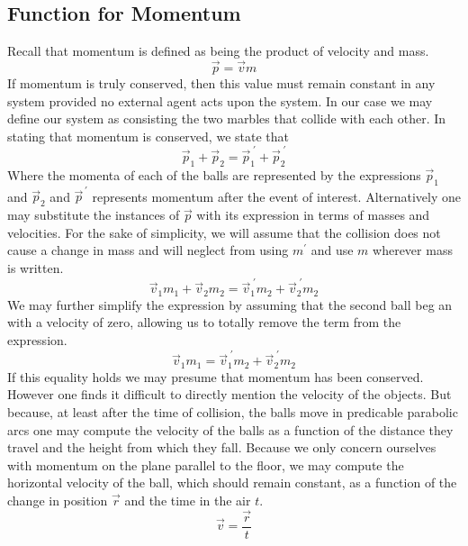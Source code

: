 \documentclass[11pt]{article}
\begin{document}
\subsection{Function for Momentum}
Recall that momentum is defined as being the product of velocity and mass.
\begin{equation}
\vec{p} = \vec{v} m
\end{equation}
If momentum is truly conserved, then this value must remain constant in any system provided no external agent acts upon the system. In our case we may define our system as consisting the two marbles that collide with each other. In stating that momentum is conserved, we state that
\begin{equation}
\vec{p}_1 + \vec{p}_2 = \vec{p}_1^{\; \prime} + \vec{p}_2^{\; \prime}
\end{equation}
Where the momenta of each of the balls are represented by the expressions \( \vec{p}_1 \) and \(\vec{p}_2 \) and \(\vec{p}^{\, \prime} \) represents momentum after the event of interest. Alternatively one may substitute the instances of \(\vec{p}\) with its expression in terms of masses and velocities. For the sake of simplicity, we will assume that the collision does not cause a change in mass and will neglect from using \(m^\prime\) and use \(m\) wherever mass is written.
\begin{equation}
\vec{v}_1 m_1 + \vec{v}_2 m_2 = \vec{v}_1^{\; \prime} m_2 + \vec{v}_2^{\; \prime} m_2
\end{equation}
We may further simplify the expression by assuming that the second ball beg	an with a velocity of zero, allowing us to totally remove the term from the expression.
\begin{equation}
\vec{v}_1 m_1 = \vec{v}_1^{\; \prime} m_2 + \vec{v}_2^{\; \prime} m_2 \label{eq:1}
\end{equation}
If this equality holds we may presume that momentum has been conserved. However one finds it difficult to directly mention the velocity of the objects. But because, at least after the time of collision, the balls move in predicable parabolic arcs one may compute the velocity of the balls as a function of the distance they travel and the height from which they fall. Because we only concern ourselves with momentum on the plane parallel to the floor, we may compute the horizontal velocity of the ball, which should remain constant, as a function of the change in position \( \vec{r} \) and the time in the air \(t\). 
\begin{equation}
\vec{v} = \frac{\vec{r}}{t}
\end{equation}
\end{document}
